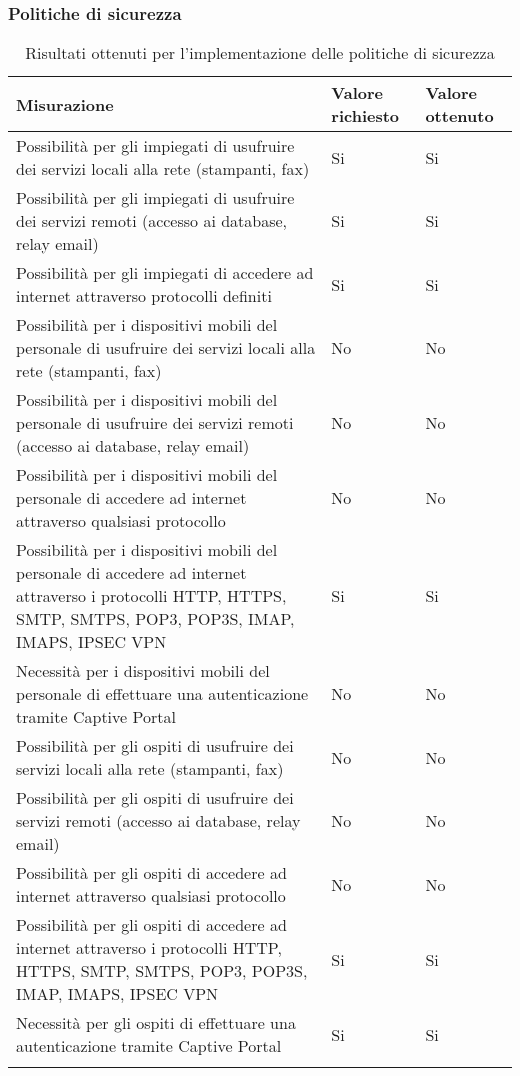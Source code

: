 \documentclass[Tesi.tex]{subfiles}
\begin{document}
\subsubsection{Politiche di sicurezza}
\label{table:Risultati ottenuti per l'implementazione delle politiche di sicurezza}
\renewcommand*{\arraystretch}{1.2}
\begin{longtable}[H]{p{9.5cm}p{3.2cm}p{2cm}}
	\rowcolor{CHeader}
	\color{CHeaderText} \textbf{Misurazione} & \color{CHeaderText} \textbf{Valore richiesto} & \color{CHeaderText} \textbf{Valore ottenuto} \\
	\endhead
	Possibilità per gli impiegati di usufruire dei servizi locali alla rete (stampanti, fax) &
	Si & Si \\
	Possibilità per gli impiegati di usufruire dei servizi remoti (accesso ai database, relay email) &
	Si & Si \\
	Possibilità per gli impiegati di accedere ad internet attraverso protocolli definiti &
	Si & Si \\
	Possibilità per i dispositivi mobili del personale di usufruire dei servizi locali alla rete (stampanti, fax) &
	No & No \\
	Possibilità per i dispositivi mobili del personale di usufruire dei servizi remoti (accesso ai database, relay email) &
	No & No \\
	Possibilità per i dispositivi mobili del personale di accedere ad internet attraverso qualsiasi protocollo &
	No & No \\
	Possibilità per i dispositivi mobili del personale di accedere ad internet attraverso i protocolli HTTP, HTTPS, SMTP, SMTPS, POP3, POP3S, IMAP, IMAPS, IPSEC VPN &
	Si & Si \\
	Necessità per i dispositivi mobili del personale di effettuare una autenticazione tramite Captive Portal &
	No & No \\
	Possibilità per gli ospiti di usufruire dei servizi locali alla rete (stampanti, fax) &
	No & No \\
	Possibilità per gli ospiti di usufruire dei servizi remoti (accesso ai database, relay email) &
	No & No \\
	Possibilità per gli ospiti di accedere ad internet attraverso qualsiasi protocollo &
	No & No \\
	Possibilità per gli ospiti di accedere ad internet attraverso i protocolli HTTP, HTTPS, SMTP, SMTPS, POP3, POP3S, IMAP, IMAPS, IPSEC VPN &
	Si & Si \\
	Necessità per gli ospiti di effettuare una autenticazione tramite Captive Portal &
	Si & Si \\
	\hiderowcolors
	\caption{Risultati ottenuti per l'implementazione delle politiche di sicurezza}
\end{longtable}
\end{document}
